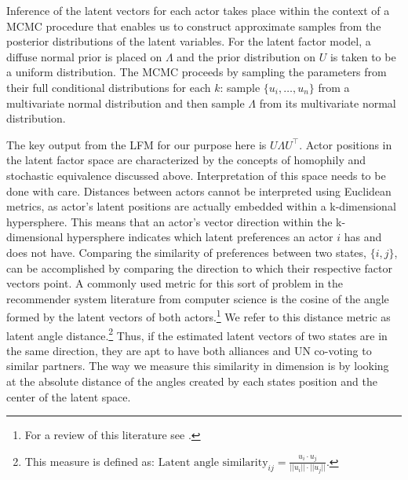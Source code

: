 Inference of the latent vectors for each actor takes place within the context of a MCMC procedure that enables us to construct approximate samples from the posterior distributions of the latent variables. For the latent factor model, a diffuse normal prior is placed on $\Lambda$ and the prior distribution on $U$ is taken to be a uniform distribution. The MCMC proceeds by sampling the parameters from their full conditional distributions for each $k$: sample $\{u_{i}, \ldots, u_{n}\}$ from a multivariate normal distribution and then sample $\Lambda$ from its multivariate normal distribution.

The key output from the LFM for our purpose here is $U \Lambda U^{\top}$. Actor positions in the latent factor space are characterized by the concepts of homophily and stochastic equivalence  discussed above. Interpretation of this space needs to be done with care. Distances between actors cannot be interpreted using Euclidean metrics, as actor's latent positions are actually embedded within a k-dimensional hypersphere. This means that an actor's vector direction within the k-dimensional hypersphere indicates which latent preferences an actor $i$ has and does not have. Comparing the similarity of preferences between two states, $\{i,j\}$, can be accomplished by comparing the direction to which their respective factor vectors point. A commonly used metric for this sort of problem in the recommender system literature from computer science is the cosine of the angle formed by the latent vectors of both actors.\footnote{For a review of this literature see \citep{amatriain:etal:2015}.} We refer to this distance metric as latent angle distance.\footnote{This measure is defined as: $\text{Latent angle similarity}_{ij} = \frac{u_{i} \cdot u_{j}}{||u_{i}|| \cdot ||u_{j}||}$.} Thus, if the estimated latent vectors of two states are in the same direction, they are apt to have both alliances and UN co-voting to similar partners. The way we measure this similarity in dimension is by looking at the absolute distance of the angles created by each states position and the center of the latent space. 
